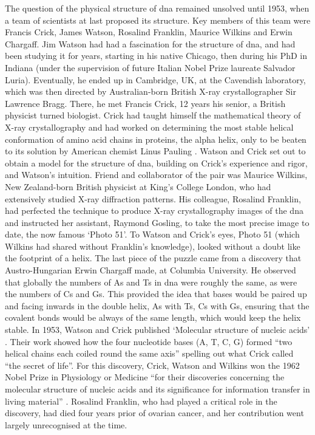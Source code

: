 The question of the physical structure of \gls{dna} remained unsolved until 1953, when a team of scientists at last proposed its structure. 
Key members of this team were Francis Crick, James Watson, Rosalind Franklin, Maurice Wilkins and Erwin Chargaff. 
Jim Watson had had a fascination for the structure of \gls{dna}, and had been studying it for years, starting in his native Chicago, then during his PhD in Indiana (under the supervision of future Italian Nobel Prize laureate Salvador Luria).
Eventually, he ended up in Cambridge, UK, at the Cavendish laboratory, which was then directed by Australian-born British X-ray crystallographer Sir Lawrence Bragg. 
There, he met Francis Crick, 12 years his senior, a British physicist turned biologist. 
Crick had taught himself the mathematical theory of X-ray crystallography and had worked on determining the most stable helical conformation of amino acid chains in proteins, the alpha helix, only to be beaten to its solution by American chemist Linus Pauling \cite{pauling1951structure}. 
Watson and Crick set out to obtain a model for the structure of \gls{dna}, building on Crick’s experience and rigor, and Watson’s intuition. 
Friend and collaborator of the pair was Maurice Wilkins, New Zealand-born British physicist at King’s College London, who had extensively studied X-ray diffraction patterns. 
His colleague, Rosalind Franklin, had perfected the technique to produce X-ray crystallography images of the \gls{dna} and instructed her assistant, Raymond Gosling, to take the most precise image to date, the now famous `Photo 51'. 
To Watson and Crick’s eyes, Photo 51 (which Wilkins had shared without Franklin's knowledge), looked without a doubt like the footprint of a helix. 
The last piece of the puzzle came from a discovery that Austro-Hungarian Erwin Chargaff made, at Columbia University. 
He observed that globally the numbers of As and Ts in \gls{dna} were roughly the same, as were the numbers of Cs and Gs. 
This provided the idea that bases would be paired up and facing inwards in the double helix, As with Ts, Cs with Gs, ensuring that the covalent bonds would be always of the same length, which would keep the helix stable. 
In 1953, Watson and Crick published `Molecular structure of nucleic acids' \cite{watson1953molecular}. 
Their work showed how the four nucleotide bases (A, T, C, G) formed “two helical chains each coiled round the same axis” \cite{watson1953molecular} spelling out what Crick called “the secret of life”. 
For this discovery, Crick, Watson and Wilkins won the 1962 Nobel Prize in Physiology or Medicine “for their discoveries concerning the molecular structure of nucleic acids and its significance for information transfer in living material” \cite{nobel1962nobel}. 
Rosalind Franklin, who had played a critical role in the discovery, had died four years prior of ovarian cancer, and her contribution went largely unrecognised at the time.

